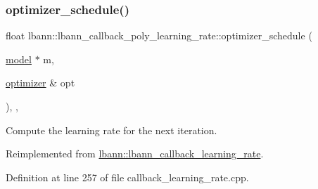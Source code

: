 \subsubsection{\texorpdfstring{optimizer\+\_\+schedule()}{optimizer\_schedule()}}
{\footnotesize\ttfamily float lbann\+::lbann\+\_\+callback\+\_\+poly\+\_\+learning\+\_\+rate\+::optimizer\+\_\+schedule (\begin{DoxyParamCaption}\item[{\hyperlink{classlbann_1_1model}{model} $\ast$}]{m,  }\item[{\hyperlink{classlbann_1_1optimizer}{optimizer} \&}]{opt }\end{DoxyParamCaption})\hspace{0.3cm}{\ttfamily [override]}, {\ttfamily [protected]}, {\ttfamily [virtual]}}

Compute the learning rate for the next iteration. 

Reimplemented from \hyperlink{classlbann_1_1lbann__callback__learning__rate_acf7f3921a68e7f1f772106e18c545345}{lbann\+::lbann\+\_\+callback\+\_\+learning\+\_\+rate}.



Definition at line 257 of file callback\+\_\+learning\+\_\+rate.\+cpp.


